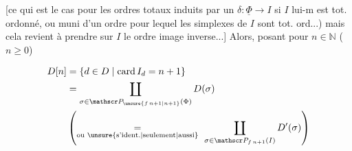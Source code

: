[ce qui est le cas pour les ordres totaux induits par un $\delta:\underline{\Phi}\to I$ si $I$ lui-m est tot. ordonné, ou muni d'un ordre  pour lequel les simplexes de $I$ sont tot. ord...) mais cela revient à prendre sur $I$ le ordre image inverse...] Alors, posant pour $n\in\mathbb N$ ($n\geq0$)

\[
 \begin{aligned}
 D[n]&=\{d\in D\mid\operatorname{card}I_d=n+1\}\\
 &=\coprod_{\sigma\in\mathscr P_{\unsure{f\,n+1|n+1}}(\Phi)}D(\sigma)\\
 &\left(\underset{\text{ou \unsure{s'ident.|seulement|aussi}}}{=}\
 \coprod_{\sigma\in\mathscr P_{f\,n+1}(I)}D'(\sigma)\right)
 \end{aligned}
\]

